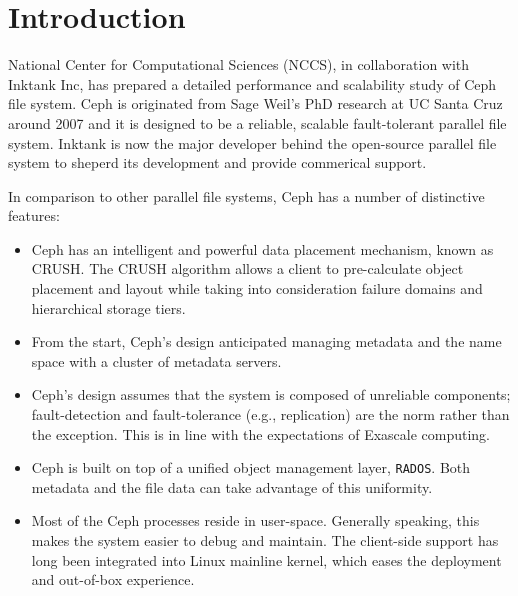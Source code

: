 \documentclass{article}
\begin{document}


\pagebreak
\thispagestyle{empty}
\tableofcontents

\pagebreak
\thispagestyle{empty}
\listoffigures

\clearpage
{}


\section{Introduction}

National Center for Computational Sciences (NCCS), in collaboration with
Inktank Inc, has prepared a detailed performance and scalability study of
Ceph file system. Ceph is originated from Sage Weil's PhD research
at UC Santa Cruz around 2007 and it is designed to be a reliable, scalable
fault-tolerant parallel file system. Inktank is now the major developer behind
the open-source parallel file system to sheperd its development and provide
commerical support.

In comparison to other parallel file systems, Ceph has a number of distinctive
features:

\begin{itemize}
 
\item Ceph has an intelligent and powerful data placement mechanism, known as
  CRUSH. The CRUSH algorithm allows a client to pre-calculate object
  placement and layout while taking into consideration failure domains and
  hierarchical storage tiers.
  
\item From the start, Ceph's design anticipated managing metadata and the name space
  with a cluster of metadata servers.

\item Ceph's design assumes that the system is composed of
unreliable components; fault-detection and fault-tolerance (e.g., replication) are
the norm rather than the exception. This is in line with the expectations of
Exascale computing.

\item Ceph is built on top of a unified object management layer,
\texttt{RADOS}. Both metadata and the file data can take advantage of this
uniformity.

\item Most of the Ceph processes reside in user-space. Generally speaking, this makes the
system easier to debug and maintain. The client-side support has long been
integrated into Linux mainline kernel, which eases the deployment and out-of-box
experience.

\end{itemize}
\end{document}
